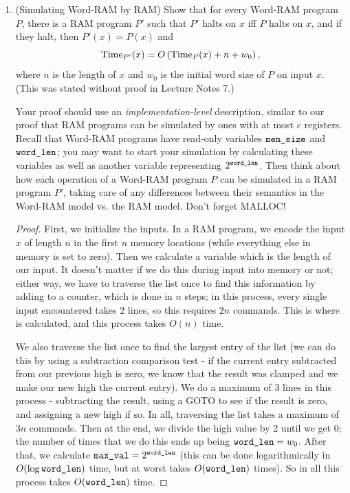 \documentclass[11pt]{article}
\begin{document}
\begin{enumerate}
\begin{enumerate}
\end{enumerate}

\item (Simulating Word-RAM by RAM)  Show that for every Word-RAM program $P$, there is a RAM program $P'$ such that $P'$ halts on $x$ iff $P$ halts on $x$, and if they halt, then  $P'(x)=P(x)$ and 
       $$\mathrm{Time}_{P'}(x) = O\left(\mathrm{Time}_P(x)+n+w_0\right),$$
where $n$ is the length of $x$ and $w_0$ is the initial word size of $P$ on input $x$.  (This was stated without proof in Lecture Notes 7.) 

Your proof should use an {\em implementation-level} description, similar to our proof that RAM programs can be simulated by ones with at most $c$ registers.  Recall that Word-RAM programs have read-only variables $\texttt{mem\_size}$ and $\texttt{word\_len}$; you may want to start your simulation by calculating these variables as well as another variable representing $2^{\texttt{word\_len}}$.  Then think about how each operation of a Word-RAM program $P$ can be simulated in a RAM program $P'$, taking care of any differences between their semantics in the Word-RAM model vs. the RAM model. Don't forget MALLOC!

\begin{proof}
First, we initialize the inputs. In a RAM program, we encode the input $x$ of length $n$ in the first $n$ memory locations (while everything else in memory is set to zero). Then we calculate a variable  which is the length of our input. It doesn't matter if we do this during input into memory or not; either way, we have to traverse the list once to find this information by adding to a counter, which is done in $n$ steps; in this process, every single input encountered takes 2 lines, so this requires $2n$ commands. This is where \memsize is calculated, and this process takes $O(n)$ time.

We also traverse the list once to find the largest entry of the list (we can do this by using a subtraction comparison test - if the current entry subtracted from our previous high is zero, we know that the result was clamped and we make our new high the current entry). We do a maximum of 3 lines in this process - subtracting the result, using a GOTO to see if the result is zero, and assigning a new high if so. In all, traversing the list takes a maximum of $3n$ commands. Then at the end, we divide the high value by 2 until we get 0; the number of times that we do this ends up being $\texttt{word\_len} = w_0$. After that, we calculate $\texttt{max\_val} = 2^{\texttt{word\_len}}$ (this can be done logarithmically in $O(\log \texttt{word\_len})$ time, but at worst takes $O(\texttt{word\_len})$ times). So in all this process takes $O(\texttt{word\_len})$ time.


\end{proof}
\end{enumerate}
\end{document}
